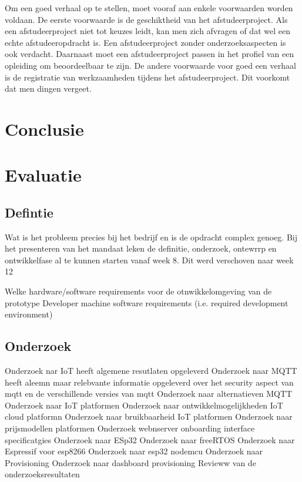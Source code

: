 		Om een goed verhaal op te stellen, moet vooraf aan enkele voorwaarden
		worden voldaan. De eerste voorwaarde is de geschiktheid van het
		afstudeerproject. Als een afstudeerproject niet tot keuzes leidt, kan
		men zich afvragen of dat wel een echte afstudeeropdracht is. Een
		afstudeerproject zonder onderzoeksaspecten is ook verdacht. Daarnaast
		moet een afstudeerproject passen in het profiel van een opleiding om
		beoordeelbaar te zijn. De andere voorwaarde voor goed een verhaal is
		de registratie van werkzaamheden tijdens het afstudeerproject. Dit
		voorkomt dat men dingen vergeet.
		
		
		
		\begin{center}
		\end{center}
	
	
	\chapter{Conclusie}
		
		\chapter{Evaluatie}
		
		\section{Defintie}
		
		Wat is het probleem precies bij het bedrijf en is de opdracht complex genoeg. Bij het presenteren van het mandaat leken de definitie, onderzoek, ontewrrp en ontwikkelfase al te kunnen starten vanaf week 8. Dit werd verschoven naar week 12
		
		Welke hardware/software requirements voor de otnwikkelomgeving van de prototype
		Developer machine software requirements (i.e. required development environment)
		
		\section{Onderzoek}
		Onderzoek nar IoT heeft algemene resutlaten opgeleverd
		Onderzoek naar MQTT heeft aleemn maar relebvante informatie opgeleverd over het security aspect van mqtt en de verschillende  versies van mqtt
		Onderzoek naar alternatieven MQTT
		Onderzoek naar IoT platformen
		Onderzoek naar ontwikkelmogelijkheden IoT cloud platformn
		Onderzoek naar bruikbaarheid IoT platformen
		Onderzoek naar prijsmodellen platformen
		Onderzoek webnserver onboarding interface specificatgies
		Onderzoek naar ESp32
		Onderzoek naar freeRTOS
		Onderzoek naar Espressif voor esp8266
		Onderzoek naar esp32 nodemcu
		Onderzoek naar Provisioning
		Onderzoek naar dashboard provisioning
		Revieww van de onderzoeksresultaten
		

